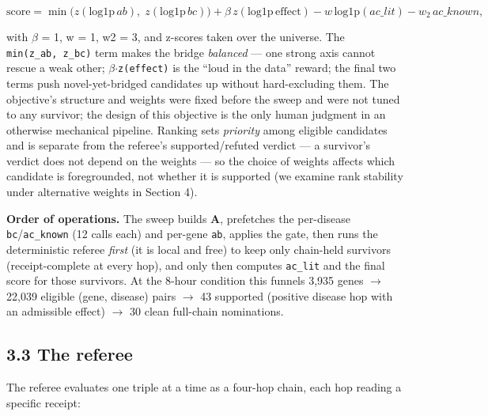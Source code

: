 \begin{equation*}
\mathrm{score} = \min\!\big(z(\mathrm{log1p}\,ab),\; z(\mathrm{log1p}\,bc)\big)
  + \beta\, z(\mathrm{log1p}\,\mathrm{effect})
  - w\,\mathrm{log1p}(\mathit{ac\_lit})
  - w_2\, \mathit{ac\_known},
\end{equation*}

with $\beta$ = 1, w = 1, w2 = 3, and z-scores taken over the universe. The \texttt{min(z\_ab,\ z\_bc)} term makes the
bridge \emph{balanced} --- one strong axis cannot rescue a weak other; \texttt{$\beta$$\cdot$z(effect)} is the ``loud in the data''
reward; the final two terms push novel-yet-bridged candidates up without hard-excluding them. The
objective's structure and weights were fixed before the sweep and were not tuned to any survivor; the
design of this objective is the only human judgment in an otherwise mechanical pipeline. Ranking sets
\emph{priority} among eligible candidates and is separate from the referee's supported/refuted verdict --- a
survivor's verdict does not depend on the weights --- so the choice of weights affects which candidate is
foregrounded, not whether it is supported (we examine rank stability under alternative weights in Section 4).

\noindent \textbf{Order of operations.} The sweep builds \textbf{A}, prefetches the per-disease \texttt{bc}/\texttt{ac\_known} (12 calls
each) and per-gene \texttt{ab}, applies the gate, then runs the deterministic referee \emph{first} (it is local and
free) to keep only chain-held survivors (receipt-complete at every hop), and only then computes \texttt{ac\_lit}
and the final score for those survivors. At the 8-hour condition this funnels 3,935 genes $\rightarrow$ 22,039 eligible
(gene, disease) pairs $\rightarrow$ 43 supported (positive disease hop with an admissible effect) $\rightarrow$ 30 clean full-chain nominations.

\subsection*{3.3 The referee}\label{the-referee}

The referee evaluates one triple at a time as a four-hop chain, each hop reading a specific receipt:

